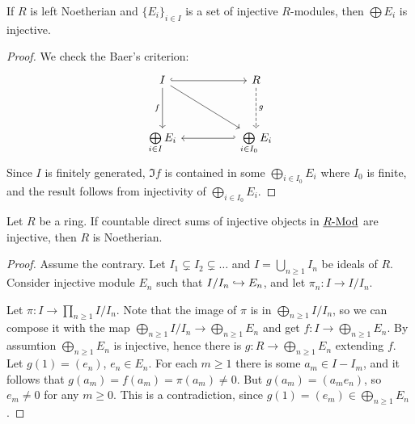 \begin{proposition*}
	If \( R \) is left Noetherian and \( \{E_i\}_{i \in I} \) is a set of injective \( R \)-modules, then \( \bigoplus E_i \) is injective.
\end{proposition*}
\begin{proof}
	We check the Baer's criterion:
	\[
		\begin{tikzcd}
			I && R \\
			\\
			{\bigoplus\limits_{i \in I} E_i} && {\bigoplus\limits_{i \in I_0} E_i}
			\arrow[hook, from=1-1, to=1-3]
			\arrow["f"', from=1-1, to=3-1]
			\arrow[from=1-1, to=3-3]
			\arrow["g", dashed, from=1-3, to=3-3]
			\arrow[hook', from=3-3, to=3-1]
		\end{tikzcd}
	\]
	Since \( I \) is finitely generated, \( \Im f \) is contained in some \( \bigoplus\limits_{i \in I_0} E_i \) where \( I_0 \) is finite, and the result follows from injectivity of \( \bigoplus\limits_{i \in I_0} E_i \).
\end{proof}

\begin{theorem*}
	Let \( R \) be a ring. If countable direct sums of injective objects in \( \underline{R\text{-}\mathrm{Mod}} \)  are injective, then \( R \) is Noetherian.
\end{theorem*}
\begin{proof}
	Assume the contrary. Let \( I_1 \subsetneq I_2 \subsetneq \dotsc \) and \( I = \bigcup\limits_{n \ge 1} I_n \) be ideals of \( R \). Consider injective module \( E_n \) such that \( I/I_n \hookrightarrow E_n \), and let \( \pi_n: I \to I/I_n \).

	\vspace*{2mm}

	Let \( \pi: I \to \prod\limits_{n \geq 1} I/I_n \). Note that the image of \( \pi \) is in \( \bigoplus\limits_{n \geq 1} I/I_n \), so we can compose it with the map \( \bigoplus\limits_{n \geq 1} I/I_n \to \bigoplus\limits_{n \geq 1} E_n \) and get \( f: I \to \bigoplus\limits_{n \geq 1} E_n \). By assumtion \( \bigoplus\limits_{n \geq 1} E_n \) is injective, hence there is \( g: R \to \bigoplus\limits_{n \geq 1} E_n \) extending \( f \). Let \( g(1) = (e_n) \), \( e_n \in E_n \). For each \( m \geq 1 \) there is some \( a_m \in I \minus I_m \), and it follows that \( g(a_m) = f(a_m) = \pi(a_m) \neq 0 \). But \( g(a_m) = (a_m e_n) \), so \( e_m \neq 0 \) for any \( m \ge 0 \). This is a contradiction, since \( g(1) = (e_m) \in \bigoplus\limits_{n \ge 1} E_n \).
\end{proof}

